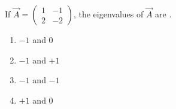 \item If $\vec{A} = \begin{pmatrix} 1 & -1 \\ 2 & -2 \end{pmatrix}$, the eigenvalues of $\vec{A}$ are \underline{\hspace{2cm}}.
\hfill{}
\begin{multicols}{4}
\begin{enumerate}
\item $-1$ and 0
\item $-1$ and $+1$
\item $-1$ and $-1$
\item $+1$ and 0
\end{enumerate}
\end{multicols}

